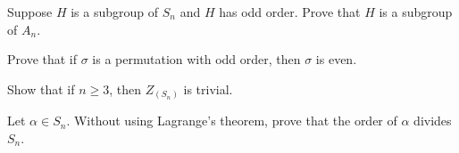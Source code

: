 \documentclass[./main.tex]{subfiles}
\begin{document}
\begin{exercise}
    Suppose $H$ is a subgroup of $S_n$ and $H$ has odd order. Prove that $H$ is
    a subgroup of $A_n$.
\end{exercise}

\begin{exercise}
    Prove that if $\sigma$ is a permutation with odd order, then $\sigma$ is
    even.
\end{exercise}

\begin{exercise}
    Show that if $n \geq 3$, then $Z_(S_n)$ is trivial. 
\end{exercise}

\begin{exercise}
    Let $\alpha \in S_n$. Without using Lagrange's theorem, prove that the order
    of $\alpha$ divides $S_n$. 
\end{exercise}
\end{document}
